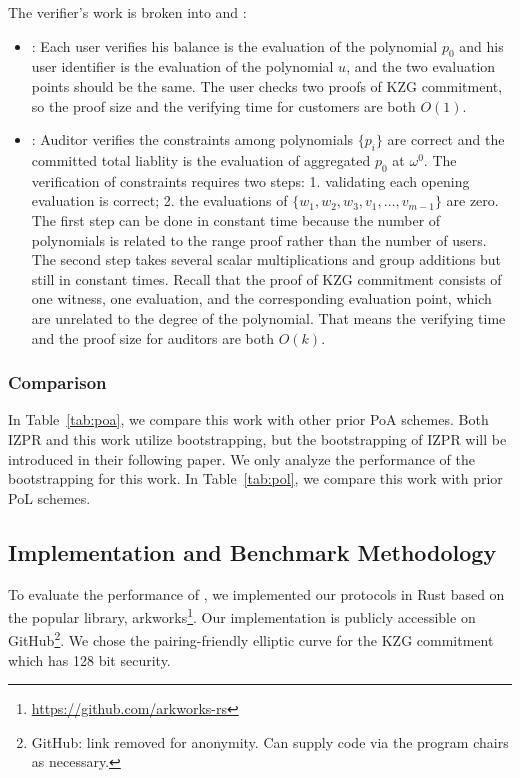 The verifier's work is broken into \userproof and \pol:
\begin{itemize}

\item \userproof: Each user verifies his balance is the evaluation of the polynomial $p_0$ and his user identifier is the evaluation of the polynomial $u$, and the two evaluation points should be the same. The user checks two proofs of KZG commitment, so the proof size and the verifying time for customers are both $O(1)$.

\item \pol: Auditor verifies the constraints among polynomials $\{p_i\}$ are correct and the committed total liablity is the evaluation of aggregated $p_0$ at $\omega^0$. The verification of constraints requires two steps: 1. validating each opening evaluation is correct; 2. the evaluations of $\{w_1,w_2,w_3,v_1,\dots,v_{m-1}\}$ are zero. The first step can be done in constant time because the number of polynomials is related to the range proof rather than the number of users. The second step takes several scalar multiplications and group additions but still in constant times. Recall that the proof of KZG commitment consists of one witness, one evaluation, and the corresponding evaluation point, which are unrelated to the degree of the polynomial. That means the verifying time and the proof size for auditors are both $O(k)$.

\end{itemize}

\subsubsection{Comparison}



In Table~\ref{tab:poa}, we compare this work with other prior PoA schemes. Both IZPR and this work utilize bootstrapping, but the bootstrapping of IZPR will be introduced in their following paper. We only analyze the performance of the bootstrapping for this work. In Table~\ref{tab:pol}, we compare this work with prior PoL schemes.


\subsection{Implementation and Benchmark Methodology}



To evaluate the performance of \Sys, we implemented our protocols in Rust based on the popular library, arkworks\footnote{\url{https://github.com/arkworks-rs}}. Our implementation is publicly accessible on GitHub\footnote{GitHub: link removed for anonymity. Can supply code via the program chairs as necessary.}. We chose the pairing-friendly elliptic curve \bls for the KZG commitment which has 128 bit security.

